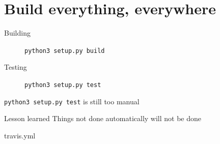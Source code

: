 \documentclass[pdf]{beamer}
\begin{document}
\section{Build everything, everywhere}

\begin{frame}[fragile]
    \begin{description}
        \item [Building] \texttt{python3 setup.py build}
        \item [Testing]  \texttt{python3 setup.py test}
    \end{description}
\end{frame}

\begin{frame}[fragile]
    \texttt{python3 setup.py test} is still too manual
\end{frame}

\begin{frame}
    \begin{block}{Lesson learned}
        Things not done automatically will not be done
    \end{block}

\end{frame}

\begin{frame}[fragile]{travis.yml}
    \inputminted[firstline = 0, lastline = 8]{yaml}{travis.yml}
    \pause
    \inputminted[firstline = 10, lastline = 14]{yaml}{travis.yml}
    \pause
    \inputminted[firstline = 16, lastline = 21]{yaml}{travis.yml}
\end{frame}
\end{document}

